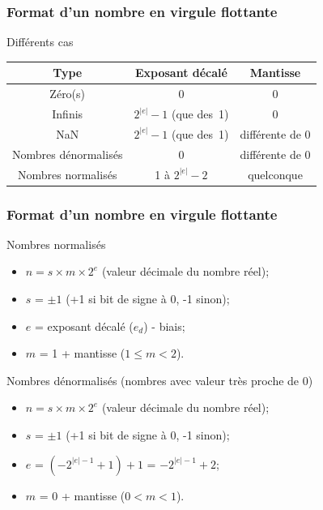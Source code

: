 \documentclass{beamer}
\begin{document}
\begin{frame}
\frametitle{Format d'un nombre en virgule flottante}

\begin{block}{Différents cas}
\begin{center}
\begin{tabular}{|c|c|c|}
  \hline
  Type & Exposant décalé & Mantisse\\
  \hline
  Zéro(s) & 0 & 0\\
  \hline
  Infinis & $2^{|e|}-1$ (que des~1) & 0\\
  \hline
  NaN & $2^{|e|}-1$ (que des~1) & différente de 0\\
  \hline
  Nombres dénormalisés & 0 & différente de 0\\
  \hline
  Nombres normalisés & 1 à $2^{|e|}-2$ & quelconque\\
  \hline
\end{tabular}
\end{center}
\end{block}  
\end{frame}

\begin{frame}
\frametitle{Format d'un nombre en virgule flottante}

\begin{block}{Nombres normalisés}
\begin{itemize}
\item $n=s\times{}m\times{}2^{e}$ (valeur décimale du nombre réel);
\item $s$ = $\pm{}1$ (+1 si bit de signe à 0, -1 sinon);
\item $e$ = exposant décalé ($e_d$) - biais;
\item $m$ = 1 + mantisse ($1\leq{}m<2$).
\end{itemize}
\end{block}

\begin{block}{Nombres dénormalisés (nombres avec valeur très proche de 0)}
\begin{itemize}
\item $n=s\times{}m\times{}2^{e}$ (valeur décimale du nombre réel);
\item $s$ = $\pm{}1$ (+1 si bit de signe à 0, -1 sinon);
\item $e$ = $(-2^{|e|-1}+1)+1$ = $-2^{|e|-1}+2$;
\item $m$ = 0 + mantisse ($0<m<1$).
\end{itemize}
\end{block}
\end{frame}
\end{document}
